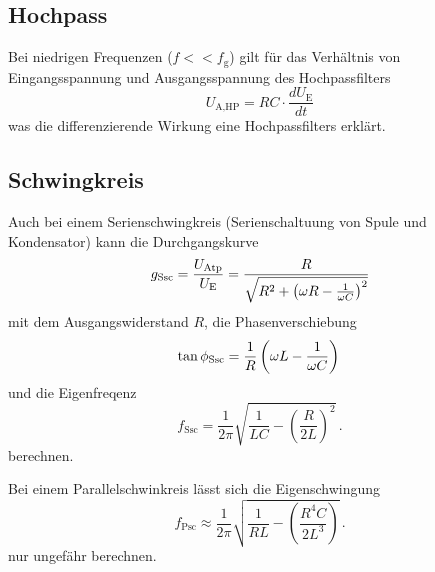 \documentclass[11pt, a4paper]{article}
\begin{document}
    \subsection{Hochpass}
    Bei niedrigen Frequenzen ($f << f_{\text{g}}$) gilt für das Verhältnis von Eingangsspannung und Ausgangsspannung des Hochpassfilters 
    \begin{equation}
        U_{\text{A,HP}}= RC \cdot \frac{dU_{\text{E}}}{dt} \label{eq:hpdiff}
    \end{equation}
    was die differenzierende Wirkung eine Hochpassfilters erklärt.



    \subsection{Schwingkreis}
    Auch bei einem Serienschwingkreis (Serienschaltuung von Spule und Kondensator) kann die Durchgangskurve
    \begin{equation}
        g_{\text{Ssc}} = \frac{U_{\text{Atp}}}{U_{\text{E}}} = \frac{R}{\sqrt{R^2 + \left( \omega R - \frac{1}{\omega C} \right)^2}} \\
    \end{equation}
    mit dem Ausgangswiderstand $R$, die Phasenverschiebung
    \begin{equation}
        \tan{\phi_{\text{Ssc}}} = \frac{1}{R}\left( \omega L - \frac{1}{\omega C} \right) \\
    \end{equation}
    und die Eigenfreqenz
    \begin{equation}
        f_{\text{Ssc}} = \frac{1}{2 \pi} \sqrt{\frac{1}{L C} - \left(\frac{R}{2L}\right)^2} \,.
    \end{equation}
    berechnen.

    Bei einem Parallelschwinkreis lässt sich die Eigenschwingung
    \begin{equation}
        f_{\text{Psc}} \approx \frac{1}{2 \pi} \sqrt{\frac{1}{R L} - \left(\frac{R^4 C}{2L^3}\right)} \,.
    \end{equation}
    nur ungefähr berechnen.

    
\end{document}
